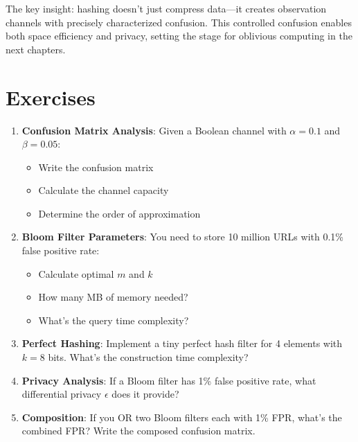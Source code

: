 The key insight: hashing doesn't just compress data—it creates observation channels with precisely characterized confusion. This controlled confusion enables both space efficiency and privacy, setting the stage for oblivious computing in the next chapters.

\section{Exercises}

\begin{enumerate}
\item \textbf{Confusion Matrix Analysis}: Given a Boolean channel with $\alpha = 0.1$ and $\beta = 0.05$:
   \begin{itemize}
   \item Write the confusion matrix
   \item Calculate the channel capacity
   \item Determine the order of approximation
   \end{itemize}

\item \textbf{Bloom Filter Parameters}: You need to store 10 million URLs with 0.1\% false positive rate:
   \begin{itemize}
   \item Calculate optimal $m$ and $k$
   \item How many MB of memory needed?
   \item What's the query time complexity?
   \end{itemize}

\item \textbf{Perfect Hashing}: Implement a tiny perfect hash filter for 4 elements with $k=8$ bits. What's the construction time complexity?

\item \textbf{Privacy Analysis}: If a Bloom filter has 1\% false positive rate, what differential privacy $\epsilon$ does it provide?

\item \textbf{Composition}: If you OR two Bloom filters each with 1\% FPR, what's the combined FPR? Write the composed confusion matrix.
\end{enumerate}